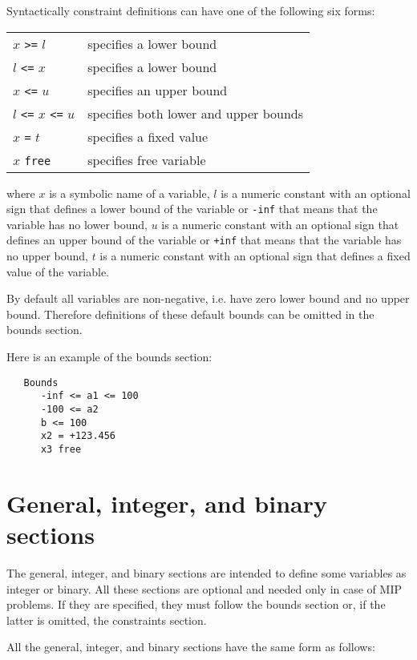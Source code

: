 Syntactically constraint definitions can have one of the following six
forms:

\begin{center}
\begin{tabular}{ll}
$x$ \verb|>=| $l$ &              specifies a lower bound \\
$l$ \verb|<=| $x$ &              specifies a lower bound \\
$x$ \verb|<=| $u$ &              specifies an upper bound \\
$l$ \verb|<=| $x$ \verb|<=| $u$ &specifies both lower and upper bounds\\
$x$ \verb|=| $t$                &specifies a fixed value \\
$x$ \verb|free|                 &specifies free variable
\end{tabular}
\end{center}

\noindent
where $x$ is a symbolic name of a variable, $l$ is a numeric constant
with an optional sign that defines a lower bound of the variable or
\verb|-inf| that means that the variable has no lower bound, $u$ is a
numeric constant with an optional sign that defines an upper bound of
the variable or \verb|+inf| that means that the variable has no upper
bound, $t$ is a numeric constant with an optional sign that defines a
fixed value of the variable.

By default all variables are non-negative, i.e. have zero lower bound
and no upper bound. Therefore definitions of these default bounds can be
omitted in the bounds section.

Here is an example of the bounds section:

\begin{verbatim}
   Bounds
      -inf <= a1 <= 100
      -100 <= a2
      b <= 100
      x2 = +123.456
      x3 free
\end{verbatim}

\section{General, integer, and binary sections}

The general, integer, and binary sections are intended to define
some variables as integer or binary. All these sections are optional
and needed only in case of MIP problems. If they are specified, they
must follow the bounds section or, if the latter is omitted, the
constraints section.

All the general, integer, and binary sections have the same form as
follows:

